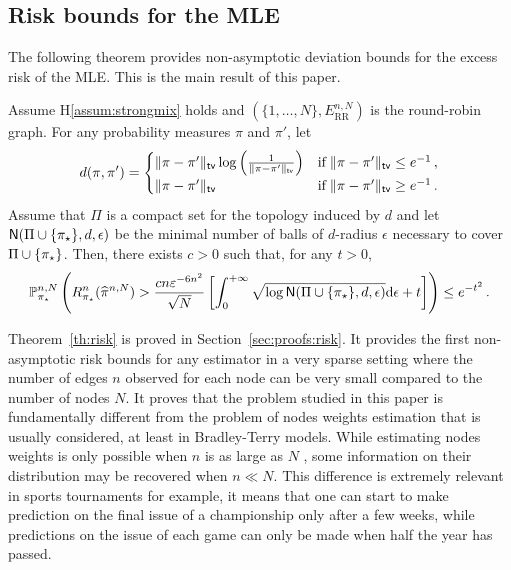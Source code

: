 \subsection{Risk bounds for the MLE}\label{sec:RBMLE}
The following theorem provides non-asymptotic deviation bounds for the excess risk of the MLE. This is the main result of this paper. 
\begin{theorem}
\label{th:risk}
Assume H\ref{assum:strongmix} holds and $(\{1,\ldots,N\},E^{n,N}_{\text{RR}})$ is the round-robin graph. For any probability measures $\pi$ and $\pi'$, let 
 \begin{equation}
 \label{eq:def:d}
 d(\pi,\pi')=
\begin{cases}
 \|\pi-\pi'\|_{\mathsf{tv}}\log\left(\frac1{\|\pi-\pi'\|_{\mathsf{tv}}}\right)&\text{if} \;\|\pi-\pi'\|_{\mathsf{tv}}\le e^{-1}\,,\\
  \|\pi-\pi'\|_{\mathsf{tv}}&\text{if} \;\|\pi-\pi'\|_{\mathsf{tv}}\ge e^{-1}\,.
\end{cases}
\end{equation}
Assume that $\Pi$ is a compact set for the topology induced by $d$ and let $\mathsf{N}(\Pi\cup\{\pi_{\star}\},d,\epsilon)$ be the minimal number of balls of $d$-radius $\epsilon$ necessary to cover $\Pi\cup\{\pi_{\star}\}$. Then, there exists $c>0$ such that, for any $t>0$,
\[
\mathbb{P}^{n,N}_{\pi_{\star}}\left(R^{n}_{\pi_{\star}}(\widehat{\pi}^{n,N})>\frac{cn\varepsilon^{-6n^2}}{\sqrt{N}}\left[\int_0^{+\infty}\sqrt{\log \mathsf{N}(\Pi\cup\{\pi_{\star}\},d,\epsilon)}\mathrm{d}\epsilon+t\right]\right)\le e^{-t^2}\,.
\] 
\end{theorem}
Theorem~\ref{th:risk} is proved in Section~\ref{sec:proofs:risk}.
It provides the first non-asymptotic risk bounds for any estimator in a very sparse setting where the number of edges $n$ observed for each node can be very small compared to the number of nodes $N$. 
It proves that the problem studied in this paper is fundamentally different from the problem of nodes weights estimation that is usually considered, at least in Bradley-Terry models. 
While estimating nodes weights is only possible when $n$ is as large as $N$ \cite{zemerlo:1929, Simons_Yao:1999, YanYangXu:2011}, some information on their distribution may be recovered when $n\ll N$. 
This difference is extremely relevant in sports tournaments for example, it means that one can start to make prediction on the final issue of a championship only after a few weeks, while predictions on the issue of each game can only be made when half the year has passed.

